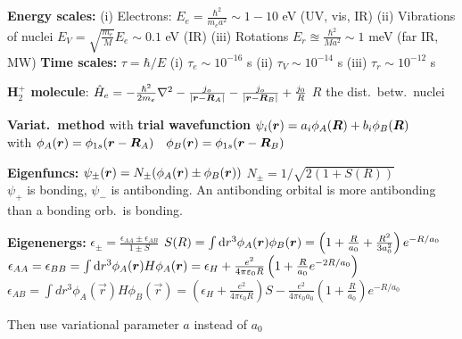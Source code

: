 \squishline

\textbf{Energy scales:} (i) Electrons: $E_e = \frac{\hbar^2}{m_e a^2}\sim 1-10$ eV (UV, vis, IR)
(ii) Vibrations of nuclei $E_V = \sqrt{\frac{m_e}{M}}E_e \sim 0.1$ eV (IR) (iii) Rotations $E_r \approxeq \frac{\hbar^2}{Ma^2} \sim 1$ meV (far IR, MW)
\textbf{Time scales:} $\tau = \hbar/E$ (i) $\tau_e \sim 10^{-16}$ s (ii) $\tau_V \sim 10^{-14}$ s (iii) $\tau_r \sim 10^{-12}$ s
\columnbreak

\textbf{H$_2^+$ molecule}: $\hat{H}_e = - \frac{\hbar^2}{2m_e} \nabla^2 - \frac{j_o}{|\bm{r} - \bm{R}_A|} - \frac{j_o}{|\bm{r} - \bm{R}_B|} + \frac{j_0}{R}$ \quad $R$ the dist.\ betw.\ nuclei 
\begin{squishlist}
    \item \textbf{Variat.\ method} with \textbf{trial wavefunction} $\psi_i(\bm{r}) = a_i \phi_A(\bm{R}) + b_i \phi_B(\bm{R})$ \\ with $\phi_A(\bm{r})=\phi_{1s}(\bm{r} - \bm{R}_A) \quad \phi_B(\bm{r})=\phi_{1s}(\bm{r} - \bm{R}_B)$ 
    \item \textbf{Eigenfuncs:} $\psi_{\pm}(\bm{r}) = N_{\pm} (\phi_A(\bm{r})\pm \phi_B(\bm{r}))$ \quad $N_{\pm} = 1/\sqrt{2(1+S(R))} $
     \\
    $\psi_+$ is bonding, $\psi_-$ is antibonding. An antibonding orbital is more antibonding than a bonding orb.\ is bonding.
    \item \textbf{Eigenenergs:} $\epsilon_{\pm} = \frac{\epsilon_{AA} \pm \epsilon_{AB}}{1\pm S}$ \quad  $S(R) = \int \textrm{d} r^3 \phi_A(\bm{r}) \phi_B(\bm{r}) = \left(1 + \frac{R}{a_0} + \frac{R^2}{3a_0^2}\right) e^{-R/a_0}$\\
    $\epsilon_{AA} = \epsilon_{BB} = \int \textrm{d} r^3 \phi_{A}(\bm{r}) H \phi_{A}(\bm{r}) = \epsilon_H + \frac{e^2}{4\pi\varepsilon_0 R}\left(1 + \frac{R}{a_0}e^{-2R/a_0}\right)$ \\
    $\epsilon_{AB} = \int dr^3 \phi_A(\vec{r}) H \phi_B(\vec{r}) = \left(\epsilon_H +  \frac{e^2}{4 \pi \epsilon_0R}\right) S - \frac{e^2}{4 \pi \epsilon_0a_0} \left( 1 + \frac{R}{a_0} \right) e^{-R/a_0}$
    \item Then use variational parameter $a$ instead of $a_0$
\end{squishlist}

\squishline

